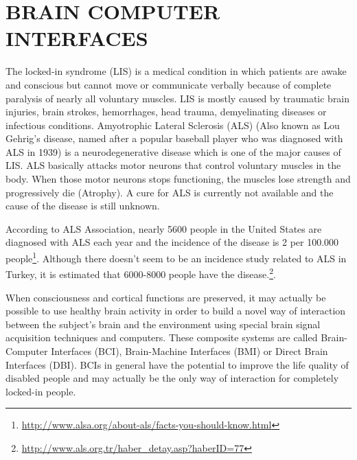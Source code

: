 \documentclass[12pt]{article}
\newcommand\mysection[1]{\vspace*{-0.35cm}\section{#1}\vspace*{6pt}\thispagestyle{empty}}
\numberwithin{equation}{section}
\numberwithin{figure}{section}
\numberwithin{table}{section}
\begin{document}
\clearpage

\mysection{BRAIN COMPUTER INTERFACES}

\par{
    The locked-in syndrome (LIS) is a medical condition in which patients are awake and conscious but
    cannot move or communicate verbally because of complete paralysis of nearly all voluntary muscles.
    LIS is mostly caused by traumatic brain injuries, brain strokes, hemorrhages, head trauma, demyelinating diseases
    or infectious conditions. Amyotrophic Lateral Sclerosis (ALS) (Also known as Lou Gehrig's disease,
    named after a popular baseball player who was diagnosed with ALS in 1939) is a neurodegenerative disease
    which is one of the major causes of LIS. ALS basically attacks motor neurons that control voluntary muscles in the body.
    When those motor neurons stops functioning, the muscles lose strength and progressively die (Atrophy).
    A cure for ALS is currently not available and the cause of the disease is still unknown.
}

\par {
    According to ALS Association, nearly 5600 people in the United States are
    diagnosed with ALS each year and the incidence of the disease is 2 per 100.000
    people\footnote{\url{http://www.alsa.org/about-als/facts-you-should-know.html}}. Although
    there doesn't seem to be an incidence study related to ALS in Turkey, it is estimated that
    6000-8000 people have the disease.\footnote{\url{http://www.als.org.tr/haber_detay.asp?haberID=77}}.
}

\par{
    When consciousness and cortical functions are preserved, it may actually be
    possible to use healthy brain activity in order to build a novel way of interaction
    between the subject's brain and the environment using special brain signal
    acquisition techniques and computers. These composite systems are called
    Brain-Computer Interfaces (BCI), Brain-Machine Interfaces (BMI) or Direct Brain Interfaces (DBI).
    BCIs in general have the potential to improve the life quality of disabled people and may actually
    be the only way of interaction for completely locked-in people.
}
\end{document}

